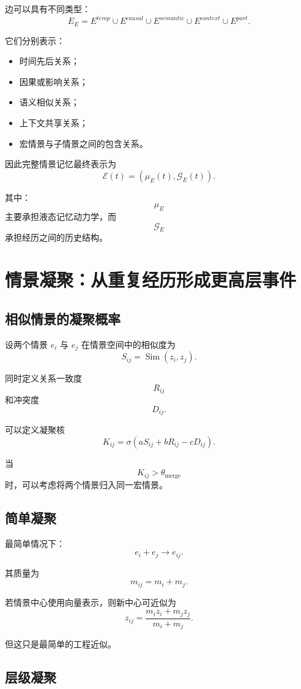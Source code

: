 边可以具有不同类型：
\[
E_E
=
E^{temp}
\cup
E^{causal}
\cup
E^{semantic}
\cup
E^{context}
\cup
E^{part}.
\]

它们分别表示：

\begin{itemize}
    \item 时间先后关系；
    \item 因果或影响关系；
    \item 语义相似关系；
    \item 上下文共享关系；
    \item 宏情景与子情景之间的包含关系。
\end{itemize}

因此完整情景记忆最终表示为
\[
\boxed{
\mathcal{E}(t)
=
\left(
\mu_E(t),
\mathcal{G}_E(t)
\right).
}
\]

其中：
\[
\mu_E
\]
主要承担液态记忆动力学，而
\[
\mathcal{G}_E
\]
承担经历之间的历史结构。

\section{情景凝聚：从重复经历形成更高层事件}

\subsection{相似情景的凝聚概率}

设两个情景 $e_i$ 与 $e_j$ 在情景空间中的相似度为
\[
S_{ij}
=
\operatorname{Sim}(z_i,z_j).
\]

同时定义关系一致度
\[
R_{ij}
\]
和冲突度
\[
D_{ij}.
\]

可以定义凝聚核
\[
\boxed{
K_{ij}
=
\sigma
\left(
aS_{ij}
+
bR_{ij}
-
cD_{ij}
\right).
}
\]

当
\[
K_{ij}>\theta_{\mathrm{merge}}
\]
时，可以考虑将两个情景归入同一宏情景。

\subsection{简单凝聚}

最简单情况下：
\[
e_i+e_j
\rightarrow
e_{ij}.
\]

其质量为
\[
m_{ij}
=
m_i+m_j.
\]

若情景中心使用向量表示，则新中心可近似为
\[
z_{ij}
=
\frac{
m_i z_i
+
m_j z_j
}{
m_i+m_j
}.
\]

但这只是最简单的工程近似。

\subsection{层级凝聚}

